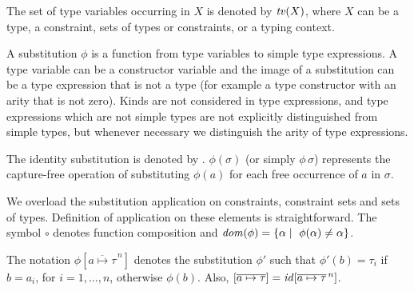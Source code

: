 The set of type variables occurring in $X$ is denoted by ${\it tv\/}(X)$,
where $X$ can be a type, a constraint, sets of types or constraints,
or a typing context.

A substitution $\phi$ is a function from type variables to simple type
expressions. A type variable can be a constructor variable and the
image of a substitution can be a type expression that is not a type
(for example a type constructor with an arity that is not zero). Kinds
are not considered in type expressions, and type expressions which are
not simple types are not explicitly distinguished from simple types,
but whenever necessary we distinguish the arity of type
expressions. 

The identity substitution is denoted by \id. $\phi(\sigma)$
(or simply $\phi\,\sigma$) represents the capture-free operation of
substituting $\phi(a)$ for each free occurrence of $a$ in $\sigma$.

We overload the substitution application on constraints, constraint
sets and sets of types. Definition of application on these elements is
straightforward. The symbol $\circ$ denotes function composition and
$\mathit{dom}(\phi)=\{\alpha \mid\ \phi(\alpha) \neq \alpha\}$.

The notation $\phi[\overline{a\mapsto\tau}^{\,n}]$ denotes the
substitution $\phi'$ such that $\phi'(b) = \tau_i$ if $b = a_i$, for
$i = 1,\ldots,n$, otherwise $\phi(b)$. Also,
$[\overline{a\mapsto\tau}] = {\it id\/}[\overline{a\mapsto\tau}^{\,n}]$.

